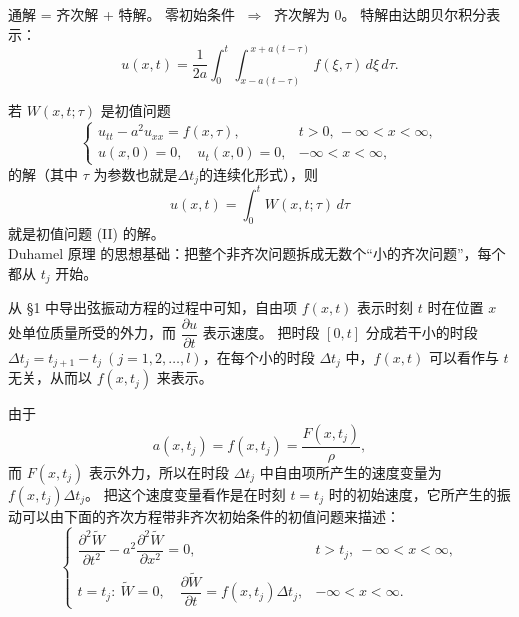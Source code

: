 通解 = 齐次解 + 特解。  
零初始条件 $\;\Rightarrow\;$ 齐次解为 $0$。  
特解由达朗贝尔积分表示：
\[
u(x,t) = \frac{1}{2a}\int_0^t \int_{x-a(t-\tau)}^{\,x+a(t-\tau)} f(\xi,\tau)\, d\xi\, d\tau.
\]
\begin{theorem}
若 $W(x,t;\tau)$ 是初值问题
\[
\begin{cases}
u_{tt} - a^2 u_{xx} = f(x,\tau), & t > 0, \, -\infty < x < \infty, \\
u(x,0) = 0, \quad u_t(x,0) = 0, & -\infty < x < \infty,
\end{cases}
\]
的解（其中 $\tau$ 为参数也就是$\Delta t_j$的连续化形式），则
\begin{equation}
    u(x,t) = \int_0^t W(x,t;\tau)\, d\tau
    \tag{2.35}
\end{equation}
就是初值问题 (II) 的解。\\
 Duhamel 原理 的思想基础：把整个非齐次问题拆成无数个“小的齐次问题”，每个都从 $t_j$ 开始。
\end{theorem}
\begin{proposition}
    从 §1 中导出弦振动方程的过程中可知，自由项 $f(x,t)$ 表示时刻 $t$ 时在位置 $x$ 处单位质量所受的外力，而 $\dfrac{\partial u}{\partial t}$ 表示速度。  
把时段 $[0,t]$ 分成若干小的时段 $\Delta t_j = t_{j+1} - t_j \ (j=1,2,\ldots,l)$，在每个小的时段 $\Delta t_j$ 中，$f(x,t)$ 可以看作与 $t$ 无关，从而以 $f(x,t_j)$ 来表示。  

由于
\[a(x,t_j)=
f(x,t_j) = \frac{F(x,t_j)}{\rho},
\]
而 $F(x,t_j)$ 表示外力，所以在时段 $\Delta t_j$ 中自由项所产生的速度变量为 $f(x,t_j)\Delta t_j$。  
把这个速度变量看作是在时刻 $t=t_j$ 时的初始速度，它所产生的振动可以由下面的齐次方程带非齐次初始条件的初值问题来描述：
\[
\begin{cases}
\dfrac{\partial^2 \widetilde{W}}{\partial t^2} - a^2 \dfrac{\partial^2 \widetilde{W}}{\partial x^2} = 0, 
& t > t_j,\ -\infty < x < \infty, \\[1.2em]
t = t_j : \ \widetilde{W}=0,\quad \dfrac{\partial \widetilde{W}}{\partial t} = f(x,t_j)\Delta t_j, 
& -\infty < x < \infty.
\end{cases}
\tag{2.32}
\]
\end{proposition}

